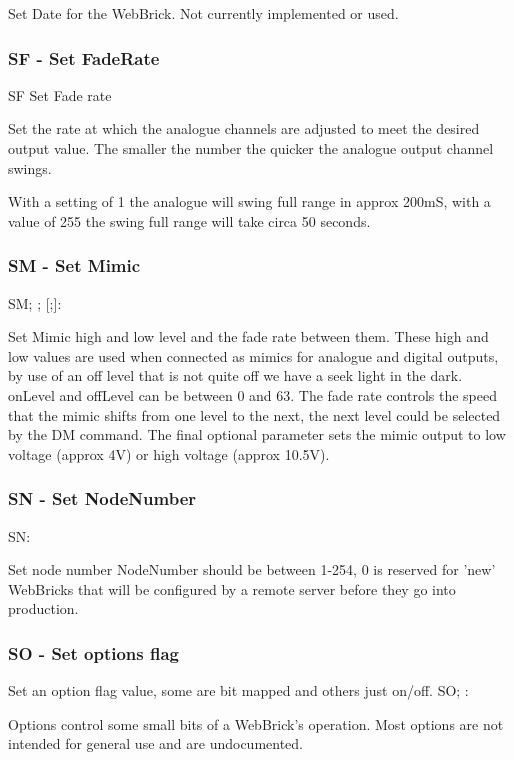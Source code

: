 Set Date for the WebBrick. Not currently implemented or used.
	
\subsubsection{SF - Set FadeRate}
SF  Set Fade rate

Set the rate at which the analogue channels are adjusted to meet the desired output value. 
The smaller the number the quicker the analogue output channel swings.

With a setting of 1 the analogue will swing full range in approx 200mS, with a value of 255 the swing
full range will take circa 50 seconds.

\subsubsection{SM - Set Mimic}
SM; ; [;]:

Set Mimic high and low level and the fade rate between them. These high and low values are used
when connected as mimics for analogue and digital outputs, by use of an off level that is not quite off 
we have a seek light in the dark. onLevel and offLevel can be between 0 and 63. The fade rate controls the speed that the mimic shifts from one level to
the next, the next level could be selected by the DM command. The final optional parameter sets the mimic 
output to low voltage (approx 4V) or high voltage (approx 10.5V).

\subsubsection{SN - Set NodeNumber}
SN:

Set node number
NodeNumber should be between 1-254, 0 is reserved for 'new' WebBricks that will be configured by
a remote server before they go into production.

\subsubsection{SO - Set options flag}
Set an option flag value, some are bit mapped and others just on/off.
SO; :

Options control some small bits of a WebBrick's operation.
Most options are not intended for general use and are undocumented.

